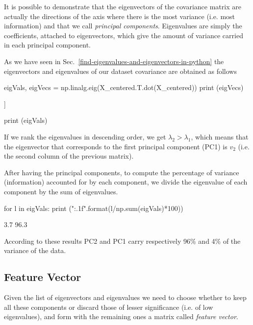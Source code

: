 It is possible to demonstrate that the eigenvectors of the covariance matrix are actually the directions of the axis where there is the most variance (i.e. most information) and that we call \emph{principal components}. Eigenvalues are simply the coefficients, attached to eigenvectors, which give the amount of variance carried in each principal component.

As we have seen in Sec.~\ref{find-eigenvalues-and-eigenvectors-in-python} the eigenvectors and eigenvalues of our dataset covariance are obtained as follows

\begin{ipython}
eigVals, eigVecs = np.linalg.eig(X_centered.T.dot(X_centered))
print (eigVecs)
\end{ipython}
\begin{ioutput}
[[-0.70710678 -0.70710678]
 [ 0.70710678 -0.70710678]]
\end{ioutput}

\begin{ipython}
print (eigVals)
\end{ipython}
\begin{ioutput}
[  7.46600865 192.53399135]
\end{ioutput}

If we rank the eigenvalues in descending order, we get $\lambda_2\gt\lambda_1$, which means that the eigenvector that corresponds to the first principal component (PC1) is  $v_2$ (i.e. the second column of the previous matrix).

After having the principal components, to compute the percentage of variance (information) accounted for by each component, we divide the eigenvalue of each component by the sum of eigenvalues. 

\begin{ipython}
for l in eigVals:
    print ("{:.1f}".format(l/np.sum(eigVals)*100))
\end{ipython}
\begin{ioutput}
3.7
96.3
\end{ioutput}

According to these results PC2 and PC1 carry respectively 96\% and 4\% of the variance of the data.

\subsection{Feature Vector}
Given the list of eigenvectors and eigenvalues we need to choose whether to keep all these components or discard those of lesser significance (i.e. of low eigenvalues), and form with the remaining ones a matrix called \emph{feature vector}.

